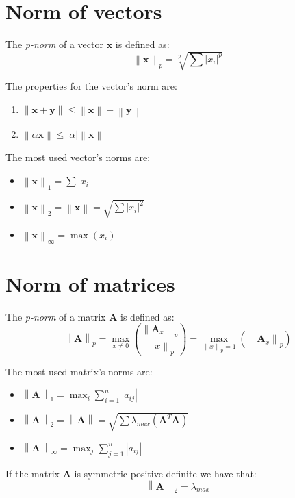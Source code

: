 \documentclass[12pt, a4paper]{report}
\newtheorem[style=M,bodystyle=\normalfont]{theorem}{Theorem}
\newtheorem[style=M,bodystyle=\normalfont]{proposition}{Proposition}
\newtheorem[style=M,bodystyle=\normalfont]{corollary}{Corollary}
\newtheorem[style=M,bodystyle=\normalfont]{lemma}{Lemma}
\newtheorem[style=M,bodystyle=\normalfont]{definition}{Definition}
\begin{document}
    \section{Norm of vectors}
    \begin{definition}
        The \emph{p-norm} of a vector $\boldsymbol{x}$ is defined as: 
        \[\left\lVert \boldsymbol{x} \right\rVert_p=\sqrt[p]{\sum{\left\lvert x_i \right\rvert^p }}\]
    \end{definition}
    The properties for the vector's norm are: 
    \begin{enumerate}
        \item $\left\lVert \boldsymbol{x}+\boldsymbol{y} \right\rVert \leq \left\lVert \boldsymbol{x} \right\rVert + \left\lVert \boldsymbol{y} \right\rVert$
        \item $\left\lVert \alpha \boldsymbol{x} \right\rVert \leq \left\lvert \alpha \right\rvert \left\lVert \boldsymbol{x} \right\rVert$
    \end{enumerate}
    The most used vector's norms are: 
    \begin{itemize}
        \item $\left\lVert \boldsymbol{x} \right\rVert_1=\sum{\left\lvert x_i \right\rvert}$
        \item $\left\lVert \boldsymbol{x} \right\rVert_2=\left\lVert \boldsymbol{x} \right\rVert=\sqrt{\sum{\left\lvert x_i \right\rvert^2}}$
        \item $\left\lVert \boldsymbol{x} \right\rVert_{\infty}=\max{\left(x_i\right)}$
    \end{itemize}

    \section{Norm of matrices}
    \begin{definition}
        The \emph{p-norm} of a matrix $\boldsymbol{A}$ is defined as: 
        \[\left\lVert \boldsymbol{A} \right\rVert_p=\max_{x \neq 0}{\left( \dfrac{\left\lVert \boldsymbol{A}_x \right\rVert_p}{\left\lVert x \right\rVert_p} \right)}=
        \max_{\left\lVert x \right\rVert_p=1}{\left( \left\lVert \boldsymbol{A}_x \right\rVert_p \right)}\]
    \end{definition}
    The most used matrix's norms are: 
    \begin{itemize}
        \item $\left\lVert \boldsymbol{A} \right\rVert_1=\max_{i}{\sum_{i=1}^{n}{\left\lvert a_{ij} \right\rvert}}$
        \item $\left\lVert \boldsymbol{A} \right\rVert_2=\left\lVert \boldsymbol{A} \right\rVert=\sqrt{\sum{\lambda_{max}{\left( \boldsymbol{A}^T\boldsymbol{A} \right)}}}$
        \item $\left\lVert \boldsymbol{A} \right\rVert_{\infty}=\max_{j}{\sum_{j=1}^{n}{\left\lvert a_{ij} \right\rvert}}$
    \end{itemize}
    \begin{proposition}
        If the matrix $\boldsymbol{A}$ is symmetric positive definite we have that: 
        \[\left\lVert \boldsymbol{A} \right\rVert_2=\lambda_{max}\]
    \end{proposition}

    
\end{document}
